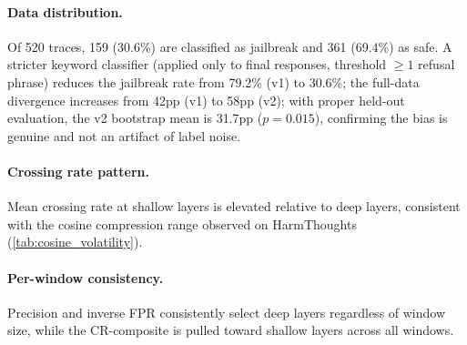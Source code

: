 \paragraph{Data distribution.} Of 520 traces, 159 (30.6\%) are classified as jailbreak and 361 (69.4\%) as safe. A stricter keyword classifier (applied only to final responses, threshold ${\geq}1$ refusal phrase) reduces the jailbreak rate from 79.2\% (v1) to 30.6\%; the full-data divergence increases from 42pp (v1) to 58pp (v2); with proper held-out evaluation, the v2 bootstrap mean is 31.7pp ($p{=}0.015$), confirming the bias is genuine and not an artifact of label noise.

\begin{table}[h]
\centering
\small
\caption{AdvBench layer selection (R1-8B, 32 layers). CR-composite selects shallow layers; precision and inverse FPR select deep layers; AUROC selects mid-depth layers. Consistent with HarmThoughts (\cref{tab:layer_selection}).}
\label{tab:advbench_layer_selection}
\end{table}

\paragraph{Crossing rate pattern.} Mean crossing rate at shallow layers is elevated relative to deep layers, consistent with the cosine compression range observed on HarmThoughts (\cref{tab:cosine_volatility}).

\paragraph{Per-window consistency.} Precision and inverse FPR consistently select deep layers regardless of window size, while the CR-composite is pulled toward shallow layers across all windows.

